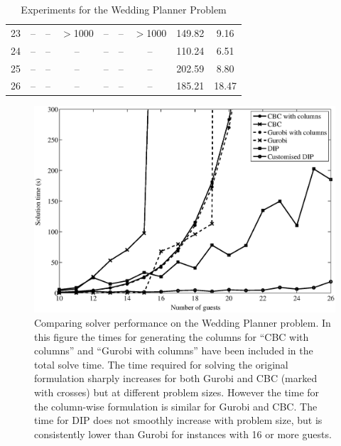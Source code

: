 \begin{table}[htp]
\begin{minipage}[l]{\textwidth}
\begin{small}
\begin{tabular}{|l@{\,}|c@{\ }|c@{\ }c@{\ }|c@{\ }|c@{\ }c@{\ }|c@{\ }c@{\,}|}
23 &    -- &   -- &$>$1000 &     -- &   -- &$>$1000 & 149.82 &  9.16 \\
24 &    -- &   -- &     -- &     -- &   -- &     -- & 110.24 &  6.51 \\
25 &    -- &   -- &     -- &     -- &   -- &     -- & 202.59 &  8.80 \\
26 &    -- &   -- &     -- &     -- &   -- &     -- & 185.21 & 18.47 \\
\hline
\end{tabular}
\end{small}
\end{minipage}
\caption{Experiments for the Wedding Planner Problem} \label{tab:wed_exp}
\end{table}

\begin{figure}[htp]
\includegraphics[scale=0.600]{img/wedbench.eps}
\caption{Comparing solver performance on the Wedding Planner problem. 
In this figure the times for generating the columns for ``CBC with columns'' and ``Gurobi with columns'' have been included in the total solve time. The time required for solving the original formulation sharply increases for both Gurobi and CBC (marked with crosses) but at different problem sizes. However the time for the column-wise formulation is similar for Gurobi and CBC. The time for DIP does not smoothly increase with problem size, but is consistently lower than Gurobi for instances with 16 or more guests.} \label{fig:compare}
\end{figure}